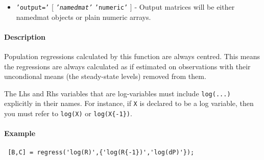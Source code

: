  \begin{itemize}
 \item
   \texttt{'output='} {[} \emph{\texttt{'namedmat'}} \textbar{}
   \texttt{'numeric'} {]} - Output matrices will be either namedmat
   objects or plain numeric arrays.
 \end{itemize}
 
 \paragraph{Description}
 
 Population regressions calculated by this function are always centred.
 This means the regressions are always calculated as if estimated on
 observations with their uncondional means (the steady-state levels)
 removed from them.
 
 The Lhs and Rhs variables that are log-variables must include
 \texttt{log(...)} explicitly in their names. For instance, if \texttt{X}
 is declared to be a log variable, then you must refer to \texttt{log(X)}
 or \texttt{log(X\{-1\})}.
 
 \paragraph{Example}
 
 \begin{verbatim}
 [B,C] = regress('log(R)',{'log(R{-1})','log(dP)'});
 \end{verbatim}


